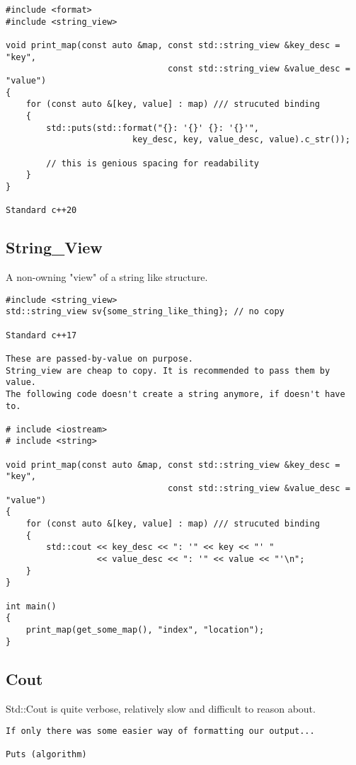 \begin{verbatim}
#include <format>
#include <string_view>

void print_map(const auto &map, const std::string_view &key_desc = "key",
                                const std::string_view &value_desc = "value")
{
    for (const auto &[key, value] : map) /// strucuted binding
    {
        std::puts(std::format("{}: '{}' {}: '{}'",
                         key_desc, key, value_desc, value).c_str());

        // this is genious spacing for readability
    }
}

Standard c++20
\end{verbatim}
\subsection{String\_View}

A non-owning "view" of a string like structure.

\begin{verbatim}
#include <string_view>
std::string_view sv{some_string_like_thing}; // no copy

Standard c++17

These are passed-by-value on purpose.
String_view are cheap to copy. It is recommended to pass them by value.
The following code doesn't create a string anymore, if doesn't have to.

# include <iostream>
# include <string>

void print_map(const auto &map, const std::string_view &key_desc = "key",
                                const std::string_view &value_desc = "value")
{
    for (const auto &[key, value] : map) /// strucuted binding
    {
        std::cout << key_desc << ": '" << key << "' "
                  << value_desc << ": '" << value << "'\n";
    }
}

int main()
{
    print_map(get_some_map(), "index", "location");
}
\end{verbatim}

\subsection{Cout}

Std::Cout is quite verbose, relatively slow and difficult to reason about. 

\begin{verbatim}
If only there was some easier way of formatting our output...

Puts (algorithm)
\end{verbatim}

